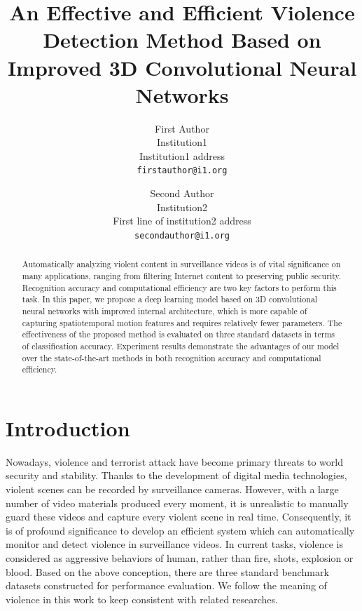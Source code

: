 \documentclass[10pt,twocolumn,letterpaper]{article}
\begin{document}
\title{An Effective and Efficient Violence Detection Method Based on Improved 3D Convolutional Neural Networks}

\author{First Author\\
Institution1\\
Institution1 address\\
{\tt\small firstauthor@i1.org}
\and
Second Author\\
Institution2\\
First line of institution2 address\\
{\tt\small secondauthor@i1.org}
}

\maketitle

\begin{abstract}
Automatically analyzing violent content in surveillance videos is of vital significance on many applications, ranging from filtering Internet content to preserving public security. Recognition accuracy and computational efficiency are two key factors to perform this task. In this paper, we propose a deep learning model based on 3D convolutional neural networks  with improved internal architecture, which is more capable of capturing spatiotemporal motion features and requires relatively fewer parameters. The effectiveness of the proposed method is evaluated on three standard datasets in terms of classification accuracy. Experiment results demonstrate the advantages of our model over the state-of-the-art methods in both recognition accuracy and computational efficiency. 
\end{abstract}

\section{Introduction} \label{sec:1}

Nowadays, violence and terrorist attack have become primary threats to world security and stability.
Thanks to the development of digital media technologies, violent scenes can be recorded by surveillance cameras.
However, with a large number of video materials produced every moment, it is unrealistic to manually guard these videos and capture every violent scene in real time.
Consequently, it is of profound significance to develop an efficient system which can automatically monitor and detect violence in surveillance videos.
In current tasks, violence is considered as aggressive behaviors of human, rather than fire, shots, explosion or blood.
Based on the above conception, there are three standard benchmark datasets constructed for performance evaluation.
We follow the meaning of violence in this work to keep consistent with related researches.
\end{document}
